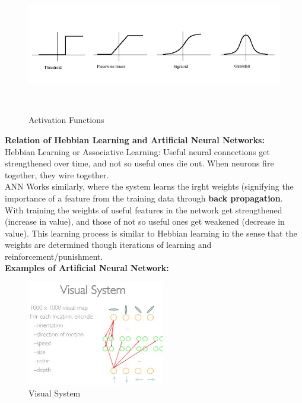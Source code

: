 \documentclass{article}
\begin{document}
\begin{figure}[htp]
\centering
\includegraphics[width=15cm, height=6cm]{images/activationfunctions.JPG}
\caption{Activation Functions}
\label{fig: Act func}
\end{figure}

\textbf{Relation of Hebbian Learning and Artificial Neural Networks:} \\
Hebbian Learning or Associative Learning: Useful neural connections get strengthened over time, and not so useful ones die out. When neurons fire together, they wire together. \\
ANN Works similarly, where the system learns the irght weights (signifying the importance of a feature from the training data through \textbf{back propagation}. With training the weights of useful features in the network get strengthened (increase in value), and those of not so useful ones get weakened (decrease in value). This learning process is similar to Hebbian learning in the sense that the weights are determined though iterations of learning and reinforcement/punishment. \\

\textbf{Examples of Artificial Neural Network:} 
\begin{figure}[h]
\centering
\includegraphics[width=6cm]{images/visualsys.JPG}
\caption{Visual System}
\label{fig: vissys}
\end{figure}
\end{document}
